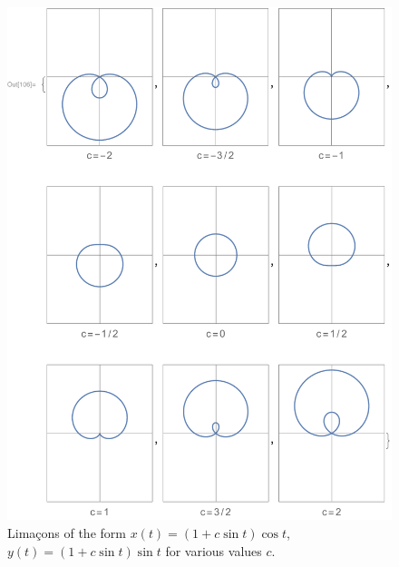 \documentclass[12pt]{article}
\begin{document}
	\begin{figure}[h!]
		\begin{center}
			\includegraphics[trim={19mm 0 3mm 0}, clip, scale=0.875]{6_Limacons}
			\caption{Lima\c{c}ons of the form $x(t)=(1+c\sin{t})\cos{t}$, $y(t)=(1+c\sin{t})\sin{t}$ for various values $c$.}
			\label{fig:limacons}
		\end{center}
	\end{figure}
\end{document}
